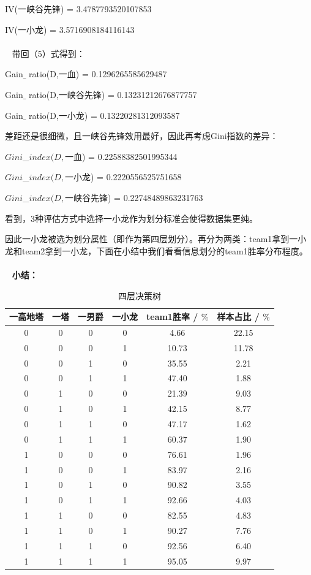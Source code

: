 \documentclass[lang=cn,11pt]{elegantpaper}
\begin{document}
IV(一峡谷先锋) = 3.4787793520107853

IV(一小龙) = 3.5716908184116143
\\~
\\~
带回（5）式得到：

Gain$\_$ ratio(D,一血) = 0.1296265585629487

Gain$\_$ ratio(D,一峡谷先锋) = 0.13231212676877757

Gain$\_$ ratio(D,一小龙) = 0.13220281312093587

差距还是很细微，且一峡谷先锋效用最好，因此再考虑Gini指数的差异：

$Gini$\_$index(D,$一血) = 0.22588382501995344

$Gini$\_$index(D,$一小龙) = 0.2220556525751658

$Gini$\_$index(D,$一峡谷先锋) = 0.22748489863231763

看到，3种评估方式中选择一小龙作为划分标准会使得数据集更纯。

因此一小龙被选为划分属性（即作为第四层划分）。再分为两类：team1拿到一小龙和team2拿到一小龙，下面在小结中我们看看信息划分的team1胜率分布程度。\\
\\~
\textbf{小结：}
\begin{table}[htbp]
\begin{center}
\begin{tabular}{cccccc}
\toprule
一高地塔& 一塔& 一男爵& 一小龙& team1胜率 / $ \% $ & 样本占比 / $ \% $\\
\midrule
0&0&0&0&4.66&22.15\\
\hline
0&0&0&1&10.73&11.78\\
\hline
0&0&1&0&35.55&2.21\\
\hline
0&0&1&1&47.40&1.88\\
\hline
0&1&0&0&21.39&9.03\\
\hline
0&1&0&1&42.15&8.77\\
\hline
0&1&1&0&47.17&1.62\\
\hline
0&1&1&1&60.37&1.90\\
\hline
1&0&0&0&76.61&1.96\\
\hline
1&0&0&1&83.97&2.16\\
\hline
1&0&1&0&90.82&3.55\\
\hline
1&0&1&1&92.66&4.03\\
\hline
1&1&0&0&82.55&4.83\\
\hline
1&1&0&1&90.27&7.76\\
\hline
1&1&1&0&92.56&6.40\\
\hline
1&1&1&1&95.05&9.97\\
\bottomrule
\end{tabular}
\caption{四层决策树 \label{tab:reg}}
\end{center}
\end{table}
\end{document}
